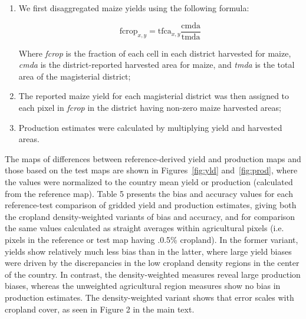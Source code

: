 \documentclass[12pt, titlepage]{article}
\begin{document}
\begin{enumerate}
  \item We first disaggregated maize yields using the following formula: 
  
  \begin{equation}
  \textrm{fcrop}_{x,y} = \textrm{tfca}_{x,y}\frac{\textrm{cmda}}{\textrm{tmda}}
  \end{equation}
  
  Where \emph{fcrop} is the fraction of each cell in each district harvested for maize, \emph{cmda} is the district-reported harvested area for maize, and \emph{tmda} is the total area of the magisterial district;
  \item The reported maize yield for each magisterial district was then assigned to each pixel in \emph{fcrop} in the district having non-zero maize harvested areas;
  \item Production estimates were calculated by multiplying yield and harvested areas.
\end{enumerate}

The maps of differences between reference-derived yield and production maps and those based on the test maps are shown in Figures~\ref{fig:yld} and~\ref{fig:prod}, where the values were normalized to the country mean yield or production (calculated from the reference map).  Table 5 presents the bias and accuracy values for each reference-test comparison of gridded yield and production estimates, giving both the cropland density-weighted variants of bias and accuracy, and for comparison the same values calculated as straight averages within agricultural pixels (i.e. pixels in the reference or test map having $.$0.5\% cropland). In the former variant, yields show relatively much less bias than in the latter, where large yield biases were driven by the discrepancies in the low cropland density regions in the center of the country. In contrast, the density-weighted measures reveal large production biases, whereas the unweighted agricultural region measures show no bias in production estimates.  The density-weighted variant shows that error scales with cropland cover, as seen in Figure 2 in the main text. 
\end{document}
